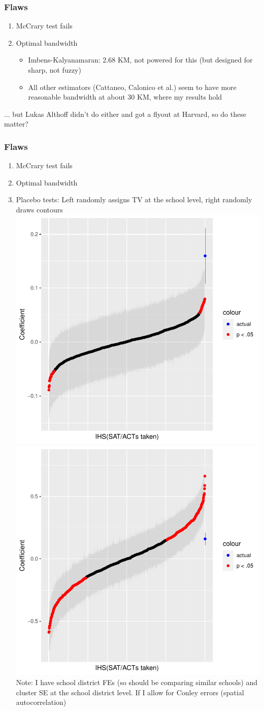 \documentclass{beamer}
\begin{document}
\begin{frame}
\frametitle{Flaws}
\begin{enumerate}
\item McCrary test fails

\item Optimal bandwidth 
\begin{itemize}
\item Imbens-Kalyanamaran: 2.68 KM, not powered for this (but designed for sharp, not fuzzy)
\item All other estimators (Cattaneo, Calonico et al.) seem to have more reasonable bandwidth at about 30 KM, where my results hold
\end{itemize}

\end{enumerate}

... but Lukas Althoff didn't do either and got a flyout at Harvard, so do these matter?
\end{frame}

\begin{frame}
\frametitle{Flaws}
\begin{enumerate}
\item McCrary test fails

\item Optimal bandwidth 

\item Placebo tests: Left randomly assigns TV at the school level, right randomly draws contours \\
\includegraphics[width=.4\textwidth]{../../analysis/Output/graphs/placebo_random_1.pdf} 
\includegraphics[width=.4\textwidth]{../../analysis/Output/graphs/placebo_contour_1.pdf}\\

Note: I have school district FEs (so should be comparing similar schools) and cluster SE at the school district level. If I allow for Conley errors (spatial autocorrelation)
\end{enumerate}

\end{frame}
\end{document}
